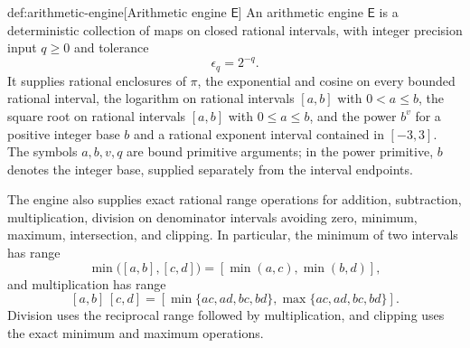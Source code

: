 \begin{definitionv}{def:arithmetic-engine}[Arithmetic engine $\mathsf E$]
An arithmetic engine \(\mathsf E\) is a deterministic collection of maps on closed rational intervals, with integer precision input \(q\ge 0\) and tolerance
\[
\epsilon_q=2^{-q}.
\]
It supplies rational enclosures of \(\pi\), the exponential and cosine on every bounded rational interval, the logarithm on rational intervals \([a,b]\) with \(0<a\le b\), the square root on rational intervals \([a,b]\) with \(0\le a\le b\), and the power \(b^v\) for a positive integer base \(b\) and a rational exponent interval contained in \([-3,3]\). The symbols \(a,b,v,q\) are bound primitive arguments; in the power primitive, \(b\) denotes the integer base, supplied separately from the interval endpoints.

The engine also supplies exact rational range operations for addition, subtraction, multiplication, division on denominator intervals avoiding zero, minimum, maximum, intersection, and clipping. In particular, the minimum of two intervals has range
\[
\min\bigl([a,b],[c,d]\bigr)
=
[\min(a,c),\min(b,d)],
\]
and multiplication has range
\[
[a,b]\,[c,d]
=
[\min\{ac,ad,bc,bd\},\max\{ac,ad,bc,bd\}].
\]
Division uses the reciprocal range followed by multiplication, and clipping uses the exact minimum and maximum operations.


\end{definitionv}
